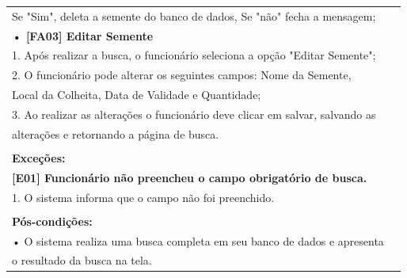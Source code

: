 \documentclass[12pt,a4paper]{article}
\begin{document}
\begin{table}[H]
\begin{tabular}{|l|c|}
Se "Sim", deleta a semente do banco de dados, Se "não" fecha a mensagem; \\ 
{\bf • [FA03] Editar Semente}\\
1. Após realizar a busca,  o funcionário seleciona a opção "Editar Semente";\\
2. O funcionário pode alterar os seguintes campos: Nome da Semente,\\
Local da Colheita, Data de Validade e Quantidade;\\
3. Ao realizar as alterações o funcionário deve clicar em salvar, salvando as\\
alterações e retornando a página de busca.
\\\\
{\bf Exceções:}\\
 {\bf [E01] Funcionário não preencheu o campo obrigatório de busca.}\\
1. O sistema informa que o campo não foi preenchido.
\\\\
{\bf Pós-condições:}\\
• O sistema realiza uma busca completa em seu banco de dados e apresenta\\ o resultado da busca na tela.\\
\hline 
\end{tabular} 
\end{table} 
\end{document}
